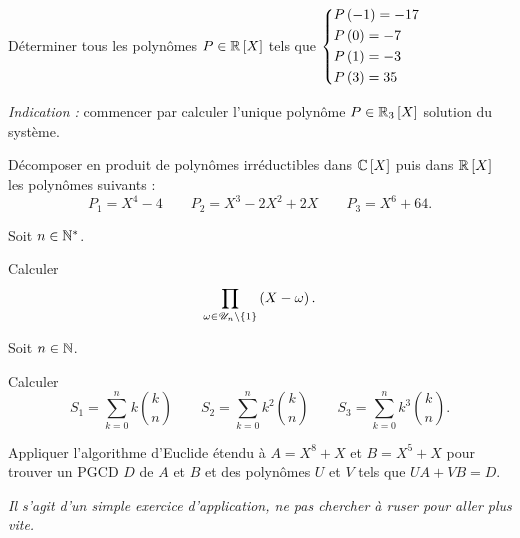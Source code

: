 \begin{corr}
\end{corr}

\begin{exo}
Déterminer tous les polynômes \(P\in\poly[\R]\) tels que \(\begin{dcases}P\left(-1\right)=-17 \\ P\left(0\right)=-7 \\ P\left(1\right)=-3 \\ P\left(3\right)=35\end{dcases}\)

\textit{Indication :} commencer par calculer l'unique polynôme \(P\in\polydeg[\R]{3}\) solution du système.
\end{exo}

\begin{corr}
\end{corr}

\begin{exo}
Décomposer en produit de polynômes irréductibles dans \(\poly[\C]\) puis dans \(\poly[\R]\) les polynômes suivants : \[P_1=X^4-4\qquad P_2=X^3-2X^2+2X\qquad P_3=X^6+64.\]
\end{exo}

\begin{corr}
\end{corr}

\begin{exo}
Soit \(n\in\mathbb{N}^*\).

Calculer \[\prod_{\omega\in\mathscr{U}_n\setminus\left\lbrace1\right\rbrace}\left(X-\omega\right).\]
\end{exo}

\begin{corr}
\end{corr}

\begin{exo}
Soit \(n\in\mathbb{N}\).

Calculer \[S_1=\sum_{k=0}^nk\binom{k}{n}\qquad S_2=\sum_{k=0}^nk^2\binom{k}{n}\qquad S_3=\sum_{k=0}^nk^3\binom{k}{n}.\]
\end{exo}

\begin{corr}
\end{corr}

\begin{exo}
Appliquer l'algorithme d'Euclide étendu à \(A=X^8+X\) et \(B=X^5+X\) pour trouver un PGCD \(D\) de \(A\) et \(B\) et des polynômes \(U\) et \(V\) tels que \(UA+VB=D\).

\textit{Il s'agit d'un simple exercice d'application, ne pas chercher à ruser pour aller plus vite.}
\end{exo}

